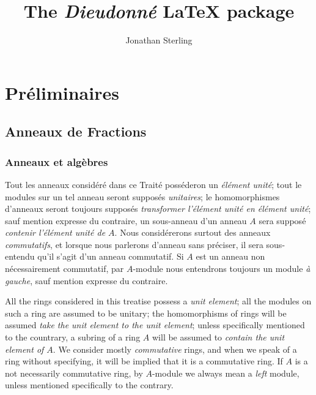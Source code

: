 \documentclass[french]{ega}
\title{The \emph{Dieudonné} \LaTeX{} package}
\author{Jonathan Sterling}
\begin{document}
\maketitle

\tableofcontents*

\mainmatter
{}
\chapter{Préliminaires}

\section{Anneaux de Fractions}

\subsection{Anneaux et algèbres}

\vspace{-1em}
\begin{minipage}[t]{0.5\textwidth}
  \begin{node}
    Tout les anneaux considéré dans ce Traité posséderon un
    \emph{élément unité}; tout le modules sur un tel anneau seront
    supposés \emph{unitaires}; le homomorphismes d'anneaux seront toujours
    supposés \emph{transformer l'élément unité en élément unité};
    sauf mention expresse du contraire, un sous-anneau d'un anneau \(A\) sera
    supposé \emph{contenir l'élément unité de \(A\)}. Nous considérerons
    surtout des anneaux \emph{commutatifs}, et lorsque nous parlerons  d'anneau
    sans préciser, il sera sous-entendu qu'il s'agit d'un anneau commutatif. Si
    \(A\) est un anneau non nécessairement commutatif, par \(A\)-module nous
    entendrons toujours un module \emph{à gauche}, sauf mention expresse du
    contraire.
  \end{node}
\end{minipage}
\quad
\begin{minipage}[t]{0.5\textwidth}
  \addtocounter{node}{-1}
  
  \begin{node}
    All the rings considered in this treatise possess a \emph{unit element};
    all the modules on such a ring are assumed to be unitary; the homomorphisms
    of rings will be assumed \emph{take the unit element to the unit element};
    unless specifically mentioned to the countrary, a subring of a ring \(A\)
    will be assumed to \emph{contain the unit element of \(A\)}. We consider
    mostly \emph{commutative} rings, and when we speak of a ring without
    specifying, it will be implied that  it is a commutative ring. If \(A\) is a
    not necessarily commutative ring, by \(A\)-module we always mean a
    \emph{left} module, unless mentioned specifically to the contrary.
  \end{node}

\end{minipage}
\medskip
\end{document}
